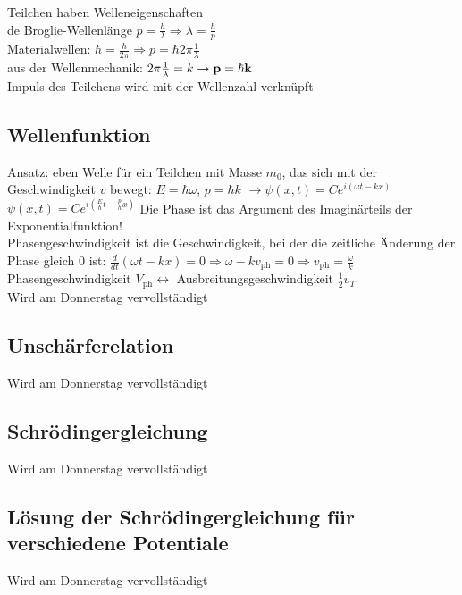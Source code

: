 \documentclass[fs, footer]{latex4ei}
\begin{document}
\begin{multicols*}{4}
Teilchen haben Welleneigenschaften\\
de Broglie-Wellenlänge $p = \frac{h}{\lambda} \Rightarrow \lambda = \frac{h}{p}$\\
Materialwellen: $\hbar = \frac{h}{2\pi} \Rightarrow p = \hbar 2\pi \frac{1}{\lambda}$\\
aus der Wellenmechanik: $2\pi\frac{1}{\lambda} = k \rightarrow \textbf{p} = \hbar \textbf{k}$\\
Impuls des Teilchens wird mit der Wellenzahl verknüpft\\

\subsection{Wellenfunktion}
Ansatz: eben Welle für ein Teilchen mit Masse $m_0$, das sich mit der Geschwindigkeit $v$ bewegt: $E = \hbar\omega$, $p =\hbar k$ $\rightarrow \psi(x,t) = Ce^{i(\omega t-kx)}$\\
$\psi(x,t) = Ce^{i(\frac{E}{\hbar}t - \frac{p}{h}x)}$ Die Phase ist das Argument des Imaginärteils der Exponentialfunktion!\\
Phasengeschwindigkeit ist die Geschwindigkeit, bei der die zeitliche Änderung der Phase gleich 0 ist:
 $\frac{d}{dt}(\omega t - kx) = 0 \Rightarrow \omega - kv_{\text{ph}} = 0 \Rightarrow v_{\text{ph}} = \frac{\omega}{k}$\\
Phasengeschwindigkeit $V_{\text{ph}}  \leftrightarrow$ Ausbreitungsgeschwindigkeit $\frac{1}{2}v_T$\\

Wird am Donnerstag vervollständigt
\subsection{Unschärferelation}
Wird am Donnerstag vervollständigt
\subsection{Schrödingergleichung}
Wird am Donnerstag vervollständigt
\subsection{Lösung der Schrödingergleichung für verschiedene Potentiale}
Wird am Donnerstag vervollständigt

\end{multicols*}
\end{document}
